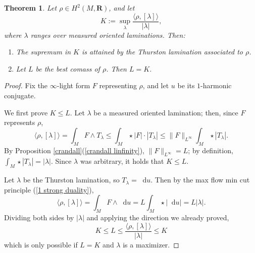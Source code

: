 \documentclass[reqno,11pt]{amsart}
\newcommand{\RR}{\mathbf{R}}
\newcommand*\dif{\mathop{}\!\mathrm{d}}
\newtheorem{theorem}{Theorem}[section]
\theoremstyle{definition}
\numberwithin{equation}{section}
\begin{document}
\begin{theorem}\label{L equals K}
	Let $\rho \in H^2(M, \RR)$, and let 
	$$K := \sup_\lambda \frac{\langle \rho, [\lambda]\rangle}{|\lambda|},$$
	where $\lambda$ ranges over measured oriented laminations. Then:
\begin{enumerate}
	\item The supremum in $K$ is attained by the Thurston lamination associated to $\rho$.
	\item Let $L$ be the best comass of $\rho$. Then $L = K$.
\end{enumerate}
\end{theorem}
\begin{proof}
Fix the $\infty$-light form $F$ representing $\rho$, and let $u$ be its $1$-harmonic conjugate.

We first prove $K \leq L$.
Let $\lambda$ be a measured oriented lamination; then, since $F$ represents $\rho$,
$$\langle \rho, [\lambda]\rangle = \int_M F \wedge T_\lambda \leq \int_M \star |F| \cdot |T_\lambda| \leq \|F\|_{L^\infty} \int_M \star |T_\lambda|.$$
By Proposition \ref{crandall}(\ref{crandall linfinity}), $\|F\|_{L^\infty} = L$; by definition, $\int_M \star |T_\lambda| = |\lambda|$.
Since $\lambda$ was arbitrary, it holds that $K \leq L$.

Let $\lambda$ be the Thurston lamination, so $T_\lambda = \dif u$.
Then by the max flow min cut principle (\ref{1 strong duality}),
$$\langle \rho, [\lambda]\rangle = \int_M F \wedge \dif u = L \int_M \star |\dif u| = L|\lambda|.$$
Dividing both sides by $|\lambda|$ and applying the direction we already proved,
$$K \leq L \leq \frac{\langle \rho, [\lambda]\rangle}{|\lambda|} \leq K$$
which is only possible if $L = K$ and $\lambda$ is a maximizer.
\end{proof}

\printbibliography
\end{document}
